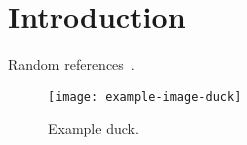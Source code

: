 \chapter{Introduction}\label{ch:introduction}
\lipsum[5]
Random references~\cite{Ringlein_2019, Sathe_2016, Malialis_2021}.

\begin{figure}[b!]
    \centering
    \texttt{[image: example-image-duck]}
    \caption[Example duck]{Example duck.}
    \label{fig:example}
\end{figure}